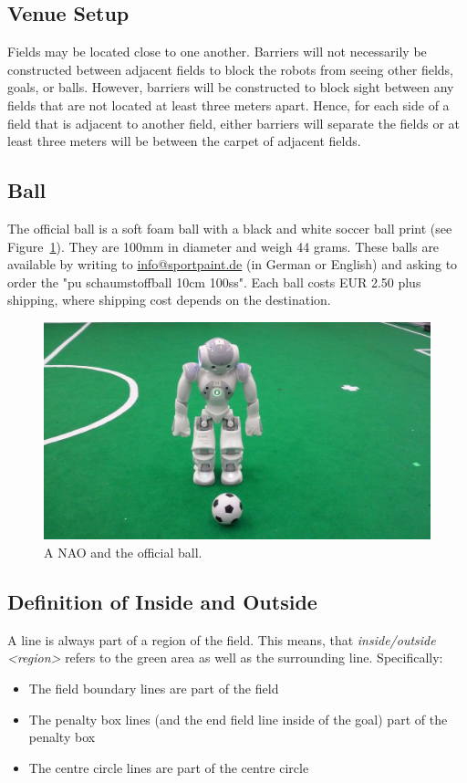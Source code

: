 \documentclass[12pt]{article}
\begin{document}
\subsection{Venue Setup}
\label{sec:boundaries}
Fields may be located close to one another.  Barriers will not necessarily be constructed between adjacent fields to block the robots from seeing other fields, goals, or balls.  However, barriers will be constructed to block sight between any fields that are not located at least three meters apart.  Hence, for each side of a field that is adjacent to another field, either barriers will separate the fields or at least three meters will be between the carpet of adjacent fields.

\subsection{Ball}
\label{sec:ball}

The official ball is a soft foam ball with a black and white soccer ball print (see Figure~\ref{fig:ball}). They are 100mm in diameter and weigh 44 grams. These balls are available by writing to \url{info@sportpaint.de} (in German or English) and asking to order the "pu schaumstoffball 10cm 100ss".  Each ball costs EUR 2.50 plus shipping, where shipping cost depends on the destination.

\begin{figure}[t]
  \centerline{\includegraphics[height=0.28\columnwidth]{figs/robotWithBall2016.jpg}}
  \caption{A NAO and the official ball.}
  \label{fig:ball}
\end{figure}

\subsection{Definition of Inside and Outside}
\label{sec:inside_outside}

A line is always part of a region of the field.
This means, that \emph{inside/outside \textless region\textgreater} refers to the green area as well as the surrounding line.
Specifically:
\begin{itemize}
    \item The field boundary lines are part of the field
    \item The penalty box lines (and the end field line inside of the goal) part of the penalty box
    \item The centre circle lines are part of the centre circle
\end{itemize}
\end{document}
